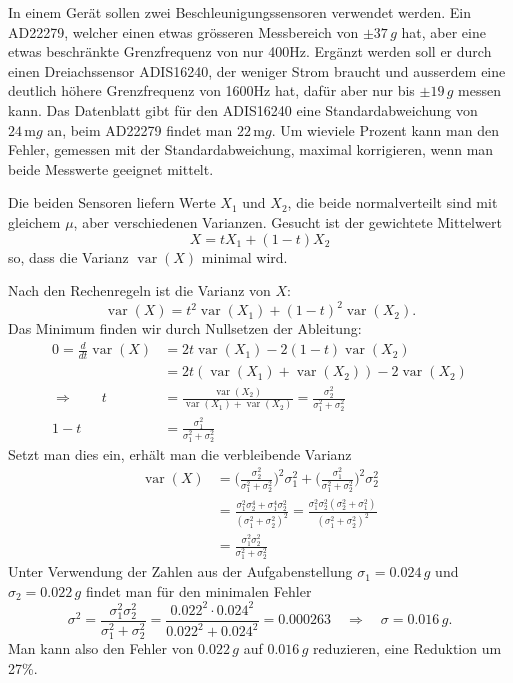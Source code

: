 In einem Gerät sollen zwei Beschleunigungssensoren verwendet
werden. Ein AD22279, welcher einen etwas grösseren Messbereich von
$\pm37\,g$ hat, aber eine etwas beschränkte Grenzfrequenz von nur 400Hz.
Ergänzt werden soll er durch einen Dreiachssensor ADIS16240,
der weniger Strom braucht und ausserdem eine deutlich höhere
Grenzfrequenz von 1600Hz hat, dafür aber nur bis $\pm19\,g$ messen kann.
Das Datenblatt gibt für den ADIS16240 eine Standardabweichung von
$24\,\text{m}g$ an, beim AD22279 findet man $22\,\text{m}g$.
Um wieviele Prozent kann man den Fehler, gemessen mit
der Standardabweichung, maximal korrigieren, wenn man beide
Messwerte geeignet mittelt.


\begin{loesung}
Die beiden Sensoren liefern Werte $X_1$ und $X_2$, die
beide normalverteilt sind mit gleichem $\mu$, aber verschiedenen
Varianzen. Gesucht ist der gewichtete Mittelwert
\[
X=tX_1+(1-t)X_2
\]
so, dass die Varianz $\operatorname{var}(X)$ minimal wird.

Nach den Rechenregeln ist die Varianz von $X$:
\[
\operatorname{var}(X)=t^2\operatorname{var}(X_1)+(1-t)^2\operatorname{var}(X_2).
\]
Das Minimum finden wir durch Nullsetzen der Ableitung:
\begin{align*}
0=\frac{d}{dt}\operatorname{var}(X)
&=
2t\operatorname{var}(X_1)-2(1-t)\operatorname{var}(X_2)
\\
&=
2t(\operatorname{var}(X_1)+\operatorname{var}(X_2)) -2\operatorname{var}(X_2)
\\
\Rightarrow\qquad
t&=\frac{\operatorname{var}(X_2)}{\operatorname{var}(X_1)+\operatorname{var}(X_2)}
=\frac{\sigma_2^2}{\sigma_1^2+\sigma_2^2}
\\
1-t&=
\frac{\sigma_1^2}{\sigma_1^2+\sigma_2^2}
\end{align*}
Setzt man dies ein, erhält man die verbleibende Varianz
\begin{align*}
\operatorname{var}(X)
&=
\biggl(
\frac{\sigma_2^2}{\sigma_1^2+\sigma_2^2}
\biggr)^2
\sigma_1^2
+
\biggl(
\frac{\sigma_1^2}{\sigma_1^2+\sigma_2^2}
\biggr)^2
\sigma_2^2
\\
&=\frac{\sigma_1^2\sigma_2^4+\sigma_1^4\sigma_2^2}{(\sigma_1^2+\sigma_2^2)^2}
=\frac{\sigma_1^2\sigma_2^2(\sigma_2^2+\sigma_1^2)}{(\sigma_1^2+\sigma_2^2)^2}
\\
&=
\frac{\sigma_1^2\sigma_2^2}{\sigma_1^2+\sigma_2^2}
\end{align*}
Unter Verwendung der Zahlen aus der Aufgabenstellung
$\sigma_1=0.024\,g$ und $\sigma_2=0.022\,g$ findet man für
den minimalen Fehler
\[
\sigma^2
=
\frac{\sigma_1^2\sigma_2^2}{\sigma_1^2+\sigma_2^2}=\frac{0.022^2\cdot 0.024^2}{0.022^2+0.024^2}=0.000263
\quad\Rightarrow\quad
\sigma
=0.016\,g.
\]
Man kann also den Fehler von $0.022\,g$ auf
$0.016\,g$ reduzieren, eine Reduktion um 27\%.
\end{loesung}

